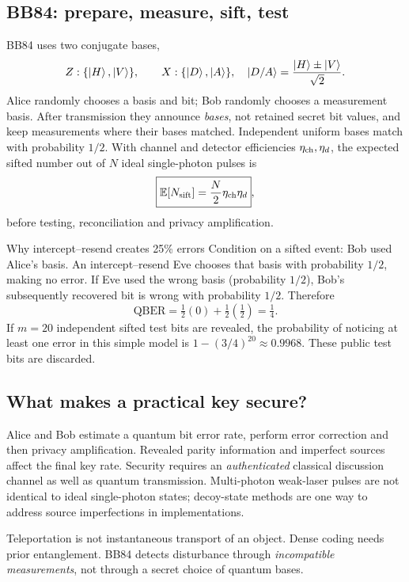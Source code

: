 \subsection{BB84: prepare, measure, sift, test}
BB84 uses two conjugate bases,
\[
Z:\{\left\lvert H\right\rangle,\left\lvert V\right\rangle\},\qquad
X:\{\left\lvert D\right\rangle,\left\lvert A\right\rangle\},\quad
\left\lvert D/A\right\rangle=\frac{\left\lvert H\right\rangle\pm\left\lvert V\right\rangle}{\sqrt2}.
\]
Alice randomly chooses a basis and bit;
Bob randomly chooses a measurement basis.
After transmission they announce \emph{bases},
not retained secret bit values, and keep
measurements where their bases matched.
Independent uniform bases match with probability
\(\boxed{1/2}\).
With channel and detector efficiencies
\(\eta_{\rm ch},\eta_d\), the expected sifted
number out of \(N\) ideal single-photon pulses is
\[
\boxed{\mathbb E[N_{\rm sift}]
=\frac N2\eta_{\rm ch}\eta_d},
\]
before testing, reconciliation and privacy
amplification.

\begin{worked}{Why intercept--resend creates 25\% errors}
Condition on a sifted event: Bob used Alice's basis.
An intercept--resend Eve chooses that basis
with probability \(1/2\), making no error.
If Eve used the wrong basis (probability \(1/2\)),
Bob's subsequently recovered bit is wrong with
probability \(1/2\). Therefore
\[
\boxed{\mathrm{QBER}=\tfrac12(0)+
\tfrac12(\tfrac12)=\tfrac14.}
\]
If \(m=20\) independent sifted test bits are
revealed, the probability of noticing at
least one error in this simple model is
\(1-(3/4)^{20}\approx0.9968\).
These public test bits are discarded.
\end{worked}

\subsection{What makes a practical key secure?}
Alice and Bob estimate a quantum bit error rate,
perform error correction and then privacy
amplification. Revealed parity information
and imperfect sources affect the final key rate.
Security requires an \emph{authenticated}
classical discussion channel as well as quantum
transmission. Multi-photon weak-laser pulses
are not identical to ideal single-photon states;
decoy-state methods are one way to address
source imperfections in implementations.

\begin{checkpoint}
Teleportation is not instantaneous transport
of an object. Dense coding needs prior
entanglement. BB84 detects disturbance
through \emph{incompatible measurements},
not through a secret choice of quantum bases.
\end{checkpoint}
